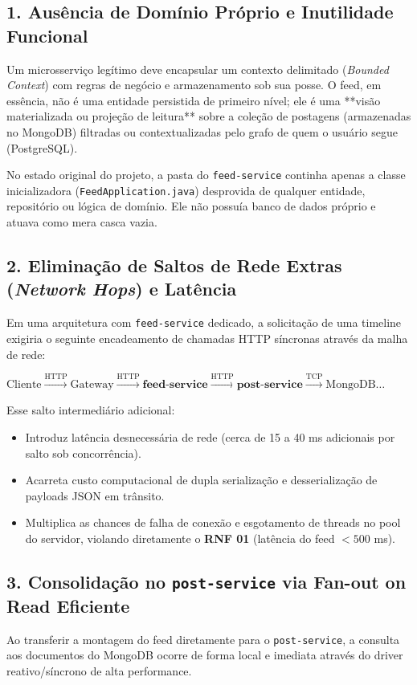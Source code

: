 \documentclass[12pt,a4paper]{report}
\begin{document}
\subsection{1. Ausência de Domínio Próprio e Inutilidade Funcional}
Um microsserviço legítimo deve encapsular um contexto delimitado (\textit{Bounded Context}) com regras de negócio e armazenamento sob sua posse. O feed, em essência, não é uma entidade persistida de primeiro nível; ele é uma **visão materializada ou projeção de leitura** sobre a coleção de postagens (armazenadas no MongoDB) filtradas ou contextualizadas pelo grafo de quem o usuário segue (PostgreSQL). 

No estado original do projeto, a pasta do \texttt{feed-service} continha apenas a classe inicializadora (\texttt{FeedApplication.java}) desprovida de qualquer entidade, repositório ou lógica de domínio. Ele não possuía banco de dados próprio e atuava como mera casca vazia.

\subsection{2. Eliminação de Saltos de Rede Extras (\textit{Network Hops}) e Latência}
Em uma arquitetura com \texttt{feed-service} dedicado, a solicitação de uma timeline exigiria o seguinte encadeamento de chamadas HTTP síncronas através da malha de rede:
\begin{center}
\small
$\text{Cliente} \xrightarrow{\text{HTTP}} \text{Gateway} \xrightarrow{\text{HTTP}} \textbf{feed-service} \xrightarrow{\text{HTTP}} \textbf{post-service} \xrightarrow{\text{TCP}} \text{MongoDB} \dots$
\end{center}
Esse salto intermediário adicional:
\begin{itemize}
    \item Introduz latência desnecessária de rede (cerca de 15 a 40 ms adicionais por salto sob concorrência).
    \item Acarreta custo computacional de dupla serialização e desserialização de payloads JSON em trânsito.
    \item Multiplica as chances de falha de conexão e esgotamento de threads no pool do servidor, violando diretamente o \textbf{RNF 01} (latência do feed $< 500$ ms).
\end{itemize}

\subsection{3. Consolidação no \texttt{post-service} via Fan-out on Read Eficiente}
Ao transferir a montagem do feed diretamente para o \texttt{post-service}, a consulta aos documentos do MongoDB ocorre de forma local e imediata através do driver reativo/síncrono de alta performance. 
\end{document}
